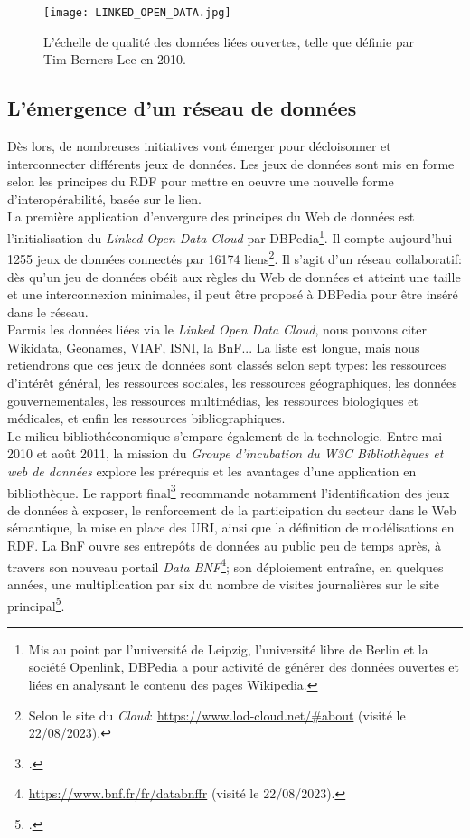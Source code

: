 \documentclass[a4paper,12pt,twoside]{book}
\begin{document}
\begin{figure}[h]
    \centering
    \texttt{[image: LINKED\_OPEN\_DATA.jpg]}
    \caption{L'échelle de qualité des données liées ouvertes, telle que définie par Tim Berners-Lee en 2010.}
    \label{fig:enter-label}
\end{figure}


\subsection{L'émergence d'un réseau de données}
Dès lors, de nombreuses initiatives vont émerger pour décloisonner et interconnecter différents jeux de données. Les jeux de données sont mis en forme selon les principes du RDF pour mettre en oeuvre une nouvelle forme d'interopérabilité, basée sur le lien.\\

La première application d'envergure des principes du Web de données est l'initialisation du \textit{Linked Open Data Cloud} par DBPedia\footnote{Mis au point par l'université de Leipzig, l'université libre de Berlin et la société Openlink, DBPedia a pour activité de générer des données ouvertes et liées en analysant le contenu des pages Wikipedia.}. Il compte aujourd'hui 1255 jeux de données connectés par 16174 liens\footnote{Selon le site du \textit{Cloud}: \url{https://www.lod-cloud.net/\#about} (visité le 22/08/2023).}. Il s'agit d'un réseau collaboratif: dès qu'un jeu de données obéit aux règles du Web de données et atteint une taille et une interconnexion minimales, il peut être proposé à DBPedia pour être inséré dans le réseau.\\

Parmis les données liées via le \textit{Linked Open Data Cloud}, nous pouvons citer Wikidata, Geonames, VIAF, ISNI, la BnF... La liste est longue, mais nous retiendrons que ces jeux de données sont classés selon sept types: les ressources d'intérêt général, les ressources sociales, les ressources géographiques, les données gouvernementales, les ressources multimédias, les ressources biologiques et médicales, et enfin les ressources bibliographiques.\\

Le milieu bibliothéconomique s'empare également de la technologie. Entre mai 2010 et août 2011, la mission du \textit{Groupe d’incubation du W3C \og Bibliothèques et web de données \fg{}} explore les prérequis et les avantages d'une application en bibliothèque. Le rapport final\footnote{\cite{bakerRapportFinalGroupe2012}.} recommande notamment l'identification des jeux de données à exposer, le renforcement de la participation du secteur dans le Web sémantique, la mise en place des URI, ainsi que la définition de modélisations en RDF. La BnF ouvre ses entrepôts de données au public peu de temps après, à travers son nouveau portail \textit{Data BNF}\footnote{\url{https://www.bnf.fr/fr/databnffr} (visité le 22/08/2023).}; son déploiement entraîne, en quelques années, une multiplication par six du nombre de visites journalières sur le site principal\footnote{\cite[p.~59]{illienWebSemantiqueNouveau2015}.}.\\
\end{document}
